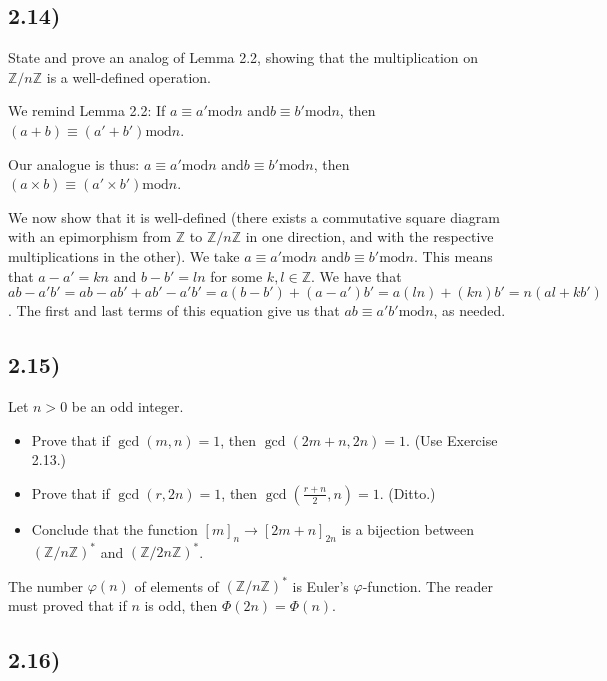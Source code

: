 \subsection*{2.14)}

State and prove an analog of Lemma 2.2, showing that the multiplication on $\mathbb{Z}/n\mathbb{Z}$ is a well-defined operation.

We remind Lemma 2.2:  If $a \equiv a' \text{mod} n$ and$ b \equiv b' \text{mod} n$, then $(a + b) \equiv (a' + b') \text{mod} n$.

Our analogue is thus: $a \equiv a' \text{mod} n$ and$ b \equiv b' \text{mod} n$, then $(a \times b) \equiv (a' \times b') \text{mod} n$.

We now show that it is well-defined (there exists a commutative square diagram with an epimorphism from $\mathbb{Z}$ to $\mathbb{Z}/n\mathbb{Z}$ in one direction, and with the respective multiplications in the other). We take $a \equiv a' \text{mod} n$ and$ b \equiv b' \text{mod} n$. This means that $a - a' = kn$ and $b - b' = ln$ for some $k, l \in \mathbb{Z}$. We have that $ab - a'b' = ab - ab' + ab' - a'b' = a(b - b') + (a - a')b' = a(ln) + (kn)b' = n(al + kb')$. The first and last terms of this equation give us that $ab \equiv a'b' \text{mod} n$, as needed. 


\subsection*{2.15)}

Let $n > 0$ be an odd integer.
\begin{itemize}
	\item Prove that if $\gcd(m, n) = 1$, then $\gcd(2m + n, 2n) = 1$. (Use Exercise 2.13.)
	\item Prove that if $\gcd(r, 2n) = 1$, then $\gcd(\frac{r+n}{2}, n) = 1$. (Ditto.)
	\item Conclude that the function $[m]_n \to [2m + n]_{2n}$ is a bijection between $(\mathbb{Z}/n\mathbb{Z})^*$ and $(\mathbb{Z}/2n\mathbb{Z})^*$.
\end{itemize}

The number $\varphi(n)$ of elements of $(\mathbb{Z}/n\mathbb{Z})^*$ is Euler's $\varphi$-function. The reader must proved that if $n$ is odd, then $\Phi(2n) = \Phi(n)$.


\subsection*{2.16)} 

